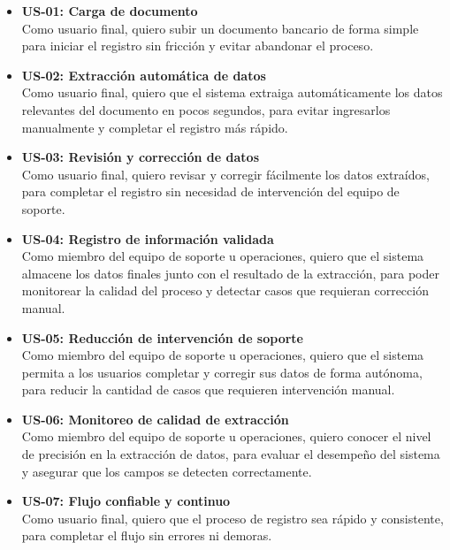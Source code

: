\begin{itemize}
\item \textbf{US-01: Carga de documento}\\
Como usuario final, quiero subir un documento bancario de forma simple para iniciar el registro sin fricción y evitar abandonar el proceso.

\item \textbf{US-02: Extracción automática de datos}\\
Como usuario final, quiero que el sistema extraiga automáticamente los datos relevantes del documento en pocos segundos, para evitar ingresarlos manualmente y completar el registro más rápido.

\item \textbf{US-03: Revisión y corrección de datos}\\
Como usuario final, quiero revisar y corregir fácilmente los datos extraídos, para completar el registro sin necesidad de intervención del equipo de soporte.

\item \textbf{US-04: Registro de información validada}\\
Como miembro del equipo de soporte u operaciones, quiero que el sistema almacene los datos finales junto con el resultado de la extracción, para poder monitorear la calidad del proceso y detectar casos que requieran corrección manual.

\item \textbf{US-05: Reducción de intervención de soporte}\\
Como miembro del equipo de soporte u operaciones, quiero que el sistema permita a los usuarios completar y corregir sus datos de forma autónoma, para reducir la cantidad de casos que requieren intervención manual.

\item \textbf{US-06: Monitoreo de calidad de extracción}\\
Como miembro del equipo de soporte u operaciones, quiero conocer el nivel de precisión en la extracción de datos, para evaluar el desempeño del sistema y asegurar que los campos se detecten correctamente.

\item \textbf{US-07: Flujo confiable y continuo}\\
Como usuario final, quiero que el proceso de registro sea rápido y consistente, para completar el flujo sin errores ni demoras.

\end{itemize}

